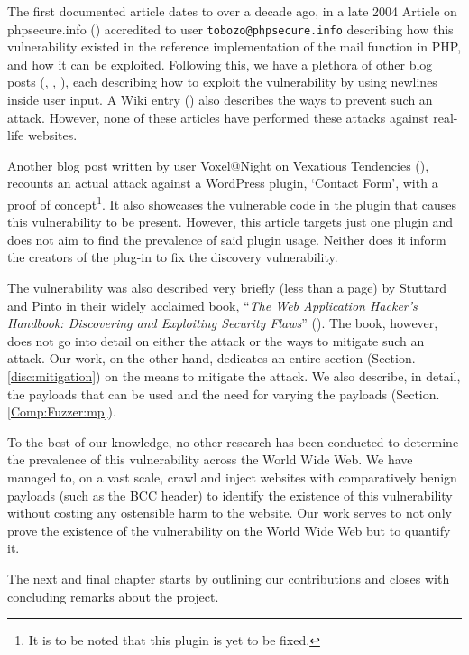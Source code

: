 The first documented article dates to over a decade ago, in a late 2004 Article on phpsecure.info (\cite{Tobozo}) accredited to user \lstinline|tobozo@phpsecure.info| describing how this vulnerability existed in the reference implementation of the mail function in PHP, and how it can be exploited. Following this, we have a plethora of other blog posts (\cite{DK}, \cite{Calin}, \cite{Injection2}), each describing how to exploit the vulnerability by using newlines inside user input. A Wiki entry (\cite{Injection}) also describes the ways to prevent such an attack. However, none of these articles have performed these attacks against real-life websites.

Another blog post written by user Voxel@Night on Vexatious Tendencies (\cite{Tendencies2014}), recounts an actual attack against a WordPress plugin, `Contact Form', with a proof of concept\footnote{It is to be noted that this plugin is yet to be fixed.}. It also showcases the vulnerable code in the plugin that causes this vulnerability to be present. However, this article targets just one plugin and does not aim to find the prevalence of said plugin usage. Neither does it inform the creators of the plug-in to fix the discovery vulnerability.

The vulnerability was also described very briefly (less than a page) by Stuttard and Pinto in their widely acclaimed book, ``\emph{The Web Application Hacker's Handbook: Discovering and Exploiting Security Flaws}'' (\cite{stuttard2011web}). The book, however, does not go into detail on either the attack or the ways to mitigate such an attack. Our work, on the other hand, dedicates an entire section (Section. \ref{disc:mitigation}) on the means to mitigate the attack. We also describe, in detail, the payloads that can be used and the need for varying the payloads (Section. \ref{Comp:Fuzzer:mp}).

To the best of our knowledge, no other research has been conducted to determine the prevalence of this vulnerability across the World Wide Web. We have managed to,  on a vast scale, crawl and inject websites with comparatively benign payloads (such as the BCC header) to identify the existence of this vulnerability without costing any ostensible harm to the website. Our work serves to not only prove the existence of the vulnerability on the World Wide Web but to quantify it.

The next and final chapter starts by outlining our contributions and closes with concluding remarks about the project.